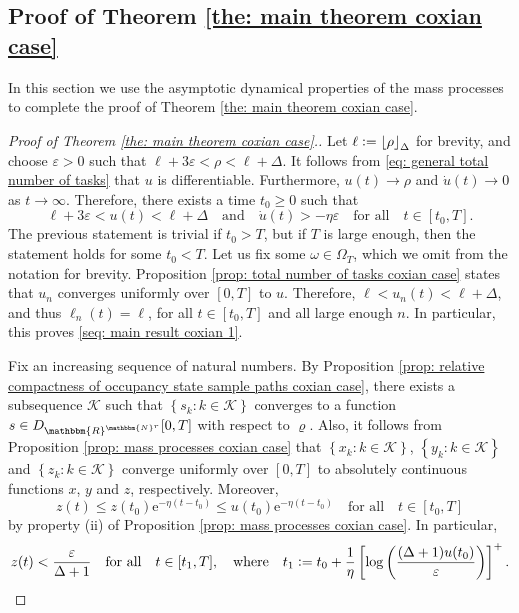 \documentclass[a4paper, 12pt]{article}
\theoremstyle{definition}
\newcommand{\floor}[1]{\left\lfloor#1\right\rfloor}
\newcommand{\set}[2]{\left\{#1 : #2\right\}}
\newcommand{\defeq}{\vcentcolon=}
\newcommand{\calK}{\mathcal{K}}
\newcommand{\N}{\mathbbm{N}}
\newcommand{\R}{\mathbbm{R}}
\newcommand{\e}{\mathrm{e}}
\begin{document}
\subsection{Proof of Theorem \ref{the: main theorem coxian case}}
\label{sub: proof of the main result coxian case}

In this section we use the asymptotic dynamical properties of the mass processes to complete the proof of Theorem \ref{the: main theorem coxian case}.

\begin{proof}[Proof of Theorem \ref{the: main theorem coxian case}.]
Let $\ell \defeq \floor{\rho}_\Delta$ for brevity, and choose $\varepsilon > 0$ such that $\ell + 3\varepsilon < \rho < \ell + \Delta$. It follows from \eqref{eq: general total number of tasks} that $u$ is differentiable. Furthermore, $u(t) \to \rho$ and $\dot{u}(t) \to 0$ as $t \to \infty$. Therefore, there exists a time $t_0 \geq 0$ such that
\begin{equation}
	\label{eq: conditions on u}
	\ell + 3\varepsilon < u(t) < \ell + \Delta \quad \text{and} \quad \dot{u}(t) > -\eta\varepsilon \quad \text{for all} \quad t \in [t_0, T].
\end{equation}
The previous statement is trivial if $t_0 > T$, but if $T$ is large enough, then the statement holds for some $t_0 < T$. Let us fix some $\omega \in \Omega_T$, which we omit from the notation for brevity. Proposition \ref{prop: total number of tasks coxian case} states that $u_n$ converges uniformly over $[0, T]$ to $u$. Therefore, $\ell < u_n(t) < \ell + \Delta$, and thus $\ell_n(t) = \ell$, for all $t \in [t_0, T]$ and all large enough $n$. In particular, this proves \eqref{seq: main result coxian 1}.

Fix an increasing sequence of natural numbers. By Proposition \ref{prop: relative compactness of occupancy state sample paths coxian case}, there exists a subsequence $\calK$ such that $\set{s_k}{k \in \calK}$ converges to a function $s \in D_{\R^{\N^r}}[0, T]$ with respect to $\varrho$. Also, it follows from Proposition \ref{prop: mass processes coxian case} that $\set{x_k}{k \in \calK}$, $\set{y_k}{k \in \calK}$ and $\set{z_k}{k \in \calK}$ converge uniformly over $[0, T]$ to absolutely continuous functions $x$, $y$ and $z$, respectively. Moreover,
\begin{equation}
	\label{eq: upper bound for z}
	z(t) \leq z(t_0)\e^{-\eta(t - t_0)} \leq u(t_0)\e^{-\eta(t - t_0)} \quad \text{for all} \quad t \in [t_0, T]
\end{equation}
by property (ii) of Proposition \ref{prop: mass processes coxian case}. In particular,
\begin{equation*}
	z(t) < \frac{\varepsilon}{\Delta + 1} \quad \text{for all} \quad t \in [t_1, T], \quad \text{where} \quad t_1 \defeq t_0 + \frac{1}{\eta}\left[\log\left(\frac{(\Delta + 1)u(t_0)}{\varepsilon}\right)\right]^+.
\end{equation*}


\end{proof}
\end{document}
